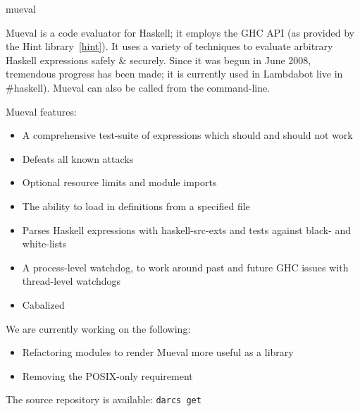\begin{hcarentry}[updated]{mueval}
\label{mueval}
\makeheader

Mueval is a code evaluator for Haskell; it employs the GHC API (as provided by the Hint library~\cref{hint}). It uses a variety of techniques to evaluate arbitrary Haskell expressions safely \& securely. Since it was begun in June 2008, tremendous progress has been made; it is currently used in Lambdabot live in \#haskell). Mueval can also be called from the command-line.

Mueval features:
\begin{itemize}
\item A comprehensive test-suite of expressions which should and should not work
\item Defeats all known attacks
\item Optional resource limits and module imports
\item The ability to load in definitions from a specified file
\item Parses Haskell expressions with haskell-src-exts and tests against black- and white-lists
\item A process-level watchdog, to work around past and future GHC issues with thread-level watchdogs
\item Cabalized
\end{itemize}
We are currently working on the following:
\begin{itemize}
\item Refactoring modules to render Mueval more useful as a library
\item Removing the POSIX-only requirement
\end{itemize}

\FurtherReading
The source repository is available:
 \texttt{darcs get}
\end{hcarentry}
